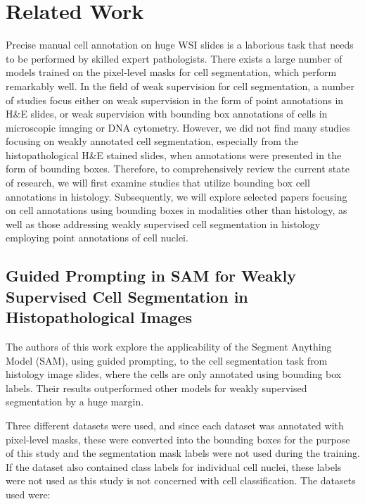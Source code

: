 \chapter{Related Work}
Precise manual cell annotation on huge WSI slides is a laborious task that needs to be performed by skilled expert pathologists. There exists a large number of models trained on the pixel-level masks for cell segmentation, which perform remarkably well. In the field of weak supervision for cell segmentation, a number of studies focus either on weak supervision in the form of point annotations in H\&E slides, or weak supervision with bounding box annotations of cells in microscopic imaging or DNA cytometry. However, we did not find many studies focusing on weakly annotated cell segmentation, especially from the histopathological H\&E stained slides, when annotations were presented in the form of bounding boxes. Therefore, to comprehensively review the current state of research, we will first examine studies that utilize bounding box cell annotations in histology. Subsequently, we will explore selected papers focusing on cell annotations using bounding boxes in modalities other than histology, as well as those addressing weakly supervised cell segmentation in histology employing point annotations of cell nuclei.


\section{Guided Prompting in SAM for Weakly Supervised Cell Segmentation in Histopathological Images \cite{Tyagi2023}}
The authors of this work explore the applicability of the Segment Anything Model (SAM), using guided prompting, to the cell segmentation task from histology image slides, where the cells are only annotated using bounding box labels. Their results outperformed other models for weakly supervised segmentation by a huge margin.

Three different datasets were used, and since each dataset was annotated with pixel-level masks, these were converted into the bounding boxes for the purpose of this study and the segmentation mask labels were not used during the training. If the dataset also contained class labels for individual cell nuclei, these labels were not used as this study is not concerned with cell classification. The datasets used were: 

